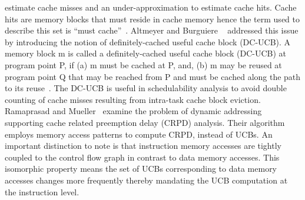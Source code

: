 estimate cache misses and an under-approximation to estimate cache hits.  Cache hits are memory blocks that must reside in cache memory hence the term used to describe this set is “must cache”~\cite{altmeyer:11c}.  Altmeyer and Burguiere ~\cite{altmeyer:11c} addressed this issue by introducing the notion of definitely-cached useful cache block (DC-UCB).  A memory block m is called a definitely-cached useful cache block (DC-UCB) at program point P, if (a) m must be cached at P, and, (b) m may be reused at program point Q that may be reached from P and must be cached along the path to its reuse~\cite{altmeyer:11c}.  The DC-UCB is useful in schedulability analysis to avoid double counting of cache misses resulting from intra-task cache block eviction.  Ramaprasad and Mueller~\cite{ramaprasad:06} examine the problem of dynamic addressing supporting cache related preemption delay (CRPD) analysis. Their algorithm employs memory access patterns to compute CRPD, instead of UCBs.  An important distinction to note is that instruction memory accesses are tightly coupled to the control flow graph in contrast to data memory accesses. This isomorphic property means the set of UCBs corresponding to data memory accesses changes more frequently thereby mandating the UCB computation at the instruction level.

